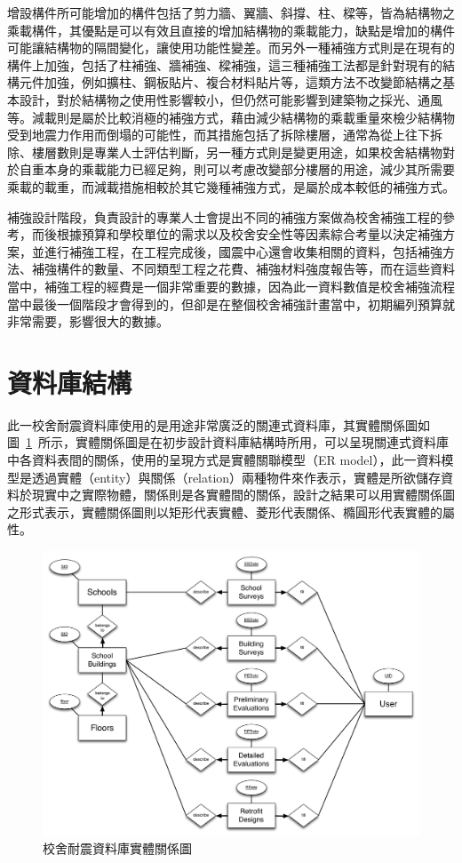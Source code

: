 增設構件所可能增加的構件包括了剪力牆、翼牆、斜撐、柱、樑等，皆為結構物之乘載構件，其優點是可以有效且直接的增加結構物的乘載能力，缺點是增加的構件可能讓結構物的隔間變化，讓使用功能性變差。而另外一種補強方式則是在現有的構件上加強，包括了柱補強、牆補強、樑補強，這三種補強工法都是針對現有的結構元件加強，例如擴柱、鋼板貼片、複合材料貼片等，這類方法不改變節結構之基本設計，對於結構物之使用性影響較小，但仍然可能影響到建築物之採光、通風等。減載則是屬於比較消極的補強方式，藉由減少結構物的乘載重量來檢少結構物受到地震力作用而倒塌的可能性，而其措施包括了拆除樓層，通常為從上往下拆除、樓層數則是專業人士評估判斷，另一種方式則是變更用途，如果校舍結構物對於自重本身的乘載能力已經足夠，則可以考慮改變部分樓層的用途，減少其所需要乘載的載重，而減載措施相較於其它幾種補強方式，是屬於成本較低的補強方式。

補強設計階段，負責設計的專業人士會提出不同的補強方案做為校舍補強工程的參考，而後根據預算和學校單位的需求以及校舍安全性等因素綜合考量以決定補強方案，並進行補強工程，在工程完成後，國震中心還會收集相關的資料，包括補強方法、補強構件的數量、不同類型工程之花費、補強材料強度報告等，而在這些資料當中，補強工程的經費是一個非常重要的數據，因為此一資料數值是校舍補強流程當中最後一個階段才會得到的，但卻是在整個校舍補強計畫當中，初期編列預算就非常需要，影響很大的數據。

\section{資料庫結構}

此一校舍耐震資料庫使用的是用途非常廣泛的關連式資料庫，其實體關係圖如圖~\ref{fig:school-er}~所示，實體關係圖是在初步設計資料庫結構時所用，可以呈現關連式資料庫中各資料表間的關係，使用的呈現方式是實體關聯模型（ER model），此一資料模型是透過實體（entity）與關係（relation）兩種物件來作表示，實體是所欲儲存資料於現實中之實際物體，關係則是各實體間的關係，設計之結果可以用實體關係圖之形式表示，實體關係圖則以矩形代表實體、菱形代表關係、橢圓形代表實體的屬性。


\begin{figure}[hbtp]
  \begin{center}
    \includegraphics[width=1.0\textwidth]{figures/school-er.pdf}
    \caption{校舍耐震資料庫實體關係圖} 
    \label{fig:school-er}
  \end{center}
\end{figure}



